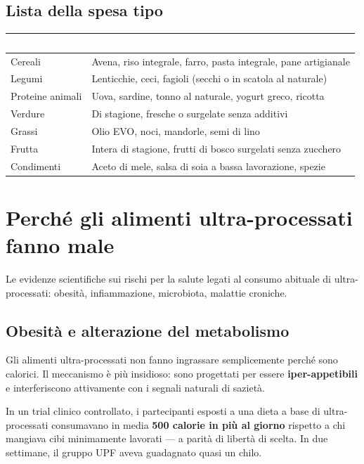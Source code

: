 \documentclass[a5paper,12pt,oneside,openany]{book}
\newcommand{\boxinfo}[2]{%
  \begin{tcolorbox}[boxbase,
    colback=blinfo!8!white, colframe=blinfo, title={#1}]
  #2\end{tcolorbox}}
\begin{document}
\section{Lista della spesa tipo}

{\small
\begin{tabularx}{\textwidth}{|L|L|}
\hline
{}\textcolor{white}{\textbf{Categoria}}
  & \textcolor{white}{\textbf{Prodotti consigliati}} \\
\hline
Cereali & Avena, riso integrale, farro, pasta integrale, pane artigianale \\
\hline
Legumi & Lenticchie, ceci, fagioli (secchi o in scatola al naturale) \\
\hline
Proteine animali & Uova, sardine, tonno al naturale, yogurt greco, ricotta \\
\hline
Verdure & Di stagione, fresche o surgelate senza additivi \\
\hline
Grassi & Olio EVO, noci, mandorle, semi di lino \\
\hline
Frutta & Intera di stagione, frutti di bosco surgelati senza zucchero \\
\hline
Condimenti & Aceto di mele, salsa di soia a bassa lavorazione, spezie \\
\hline
\end{tabularx}
}

\chapter{Perché gli alimenti ultra-processati fanno male}

Le evidenze scientifiche sui rischi per la salute legati al consumo
abituale di ultra-processati: obesità, infiammazione, microbiota,
malattie croniche.

\section{Obesità e alterazione del metabolismo}

Gli alimenti ultra-processati non fanno ingrassare semplicemente perché
sono calorici. Il meccanismo è più insidioso: sono progettati per essere
\textbf{iper-appetibili} e interferiscono attivamente con i segnali
naturali di sazietà.

\boxinfo{Studio di Kevin Hall (NIH, 2019)}{In un trial clinico controllato,
i partecipanti esposti a una dieta a base di ultra-processati consumavano
in media \textbf{500 calorie in più al giorno} rispetto a chi mangiava
cibi minimamente lavorati --- a parità di libertà di scelta. In due
settimane, il gruppo UPF aveva guadagnato quasi un chilo.}
\end{document}
